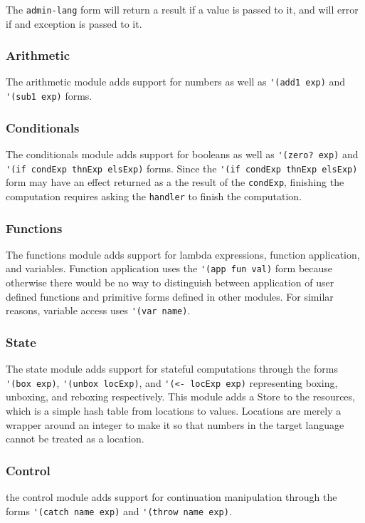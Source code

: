 The \verb#admin-lang# form will return a result if a value is passed to it, and will error if and exception is passed to it.

\subsubsection{Arithmetic}
The arithmetic module adds support for numbers as well as \verb#'(add1 exp)# and \verb#'(sub1 exp)# forms.

\subsubsection{Conditionals}
The conditionals module adds support for booleans as well as \verb#'(zero? exp)# and \verb#'(if condExp thnExp elsExp)# forms. Since the \verb#'(if condExp thnExp elsExp)# form may have an effect returned as a the result of the \verb#condExp#, finishing the computation requires asking the \verb#handler# to finish the computation.

\subsubsection{Functions}
The functions module adds support for lambda expressions, function application, and variables. Function application uses the \verb#'(app fun val)# form because otherwise there would be no way to distinguish between application of user defined functions and primitive forms defined in other modules. For similar reasons, variable access uses \verb#'(var name)#.

\subsubsection{State}
The state module adds support for stateful computations through the forms \verb#'(box exp)#, \verb#'(unbox locExp)#, and \verb#'(<- locExp exp)# representing boxing, unboxing, and reboxing respectively. This module adds a Store to the resources, which is a simple hash table from locations to values. Locations are merely a wrapper around an integer to make it so that numbers in the target language cannot be treated as a location.

\subsubsection{Control}
the control module adds support for continuation manipulation through the forms \verb#'(catch name exp)# and \verb#'(throw name exp)#.
